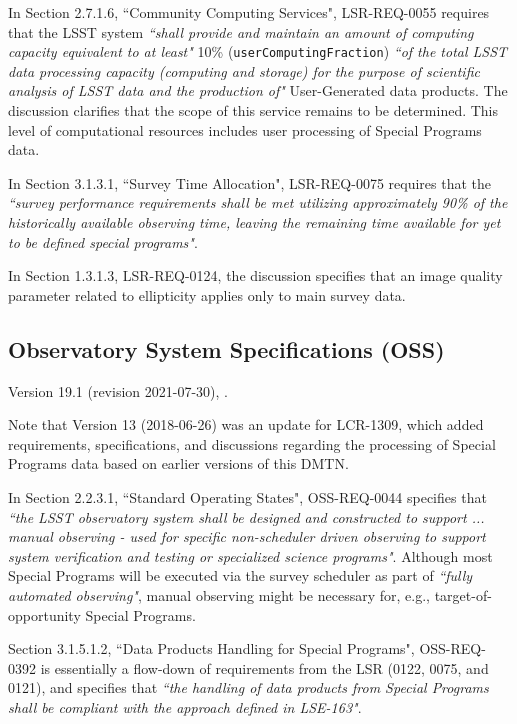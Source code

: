 In Section 2.7.1.6, ``Community Computing Services", LSR-REQ-0055 requires that the LSST system {\it ``shall provide and maintain an amount of computing capacity equivalent to at least"} 10\% ({\tt userComputingFraction}) {\it ``of the total LSST data processing capacity (computing and storage) for the purpose of scientific analysis of LSST data and the production of"} User-Generated data products. 
The discussion clarifies that the scope of this service remains to be determined.
This level of computational resources includes user processing of Special Programs data.

In Section 3.1.3.1, ``Survey Time Allocation", LSR-REQ-0075 requires that the {\it ``survey performance requirements shall be met utilizing approximately 90\% of the historically available observing time, leaving the remaining time available for yet to be defined special programs"}.

In Section 1.3.1.3, LSR-REQ-0124, the discussion specifies that an image quality parameter related to ellipticity applies only to main survey data.



\subsection{Observatory System Specifications (OSS)}

Version 19.1 (revision 2021-07-30), .

Note that Version 13 (2018-06-26) was an update for LCR-1309, which added requirements, specifications, and discussions regarding the processing of Special Programs data based on earlier versions of this DMTN.

In Section 2.2.3.1, ``Standard Operating States", OSS-REQ-0044 specifies that {\it ``the LSST observatory system shall be designed and constructed to support ... manual observing - used for specific non-scheduler driven observing to support system verification and testing or specialized science programs"}.
Although most Special Programs will be executed via the survey scheduler as part of {\it ``fully automated observing"}, manual observing might be necessary for, e.g., target-of-opportunity Special Programs.

Section 3.1.5.1.2, ``Data Products Handling for Special Programs", OSS-REQ-0392 is essentially a flow-down of requirements from the LSR (0122, 0075, and 0121), and specifies that {\it ``the handling of data products from Special Programs shall be compliant with the approach defined in LSE-163"}.


